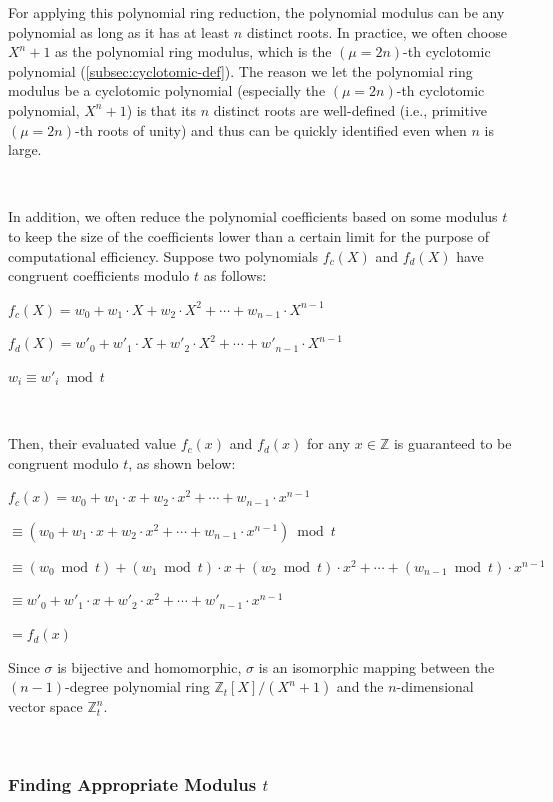 For applying this polynomial ring reduction, the polynomial modulus can be any polynomial as long as it has at least $n$ distinct roots. In practice, we often choose $X^n + 1$ as the polynomial ring modulus, which is the $(\mu=2n)$-th cyclotomic polynomial (\autoref{subsec:cyclotomic-def}). The reason we let the polynomial ring modulus be a cyclotomic polynomial (especially the $(\mu=2n)$-th cyclotomic polynomial, $X^n + 1$) is that its $n$ distinct roots are well-defined (i.e., primitive $(\mu=2n)$-th roots of unity) and thus can be quickly identified even when $n$ is large.

$ $

 In addition, we often reduce the polynomial coefficients based on some modulus $t$ to keep the size of the coefficients lower than a certain limit for the purpose of computational efficiency. Suppose two polynomials $f_c(X)$ and $f_d(X)$ have congruent coefficients modulo $t$ as follows:

$f_c(X) = w_0 + w_1\cdot X + w_2\cdot X^2 + \cdots + w_{n-1}\cdot X^{n-1}$

$f_d(X) = w'_0 + w'_1\cdot X + w'_2\cdot X^2 + \cdots + w'_{n-1}\cdot X^{n-1} $

$w_i \equiv w'_i \bmod t$

$ $

Then, their evaluated value $f_c(x)$ and $f_d(x)$ for any $x \in \mathbb{Z}$ is guaranteed to be congruent modulo $t$, as shown below:

$f_c(x) = w_0 + w_1\cdot x + w_2\cdot x^2 + \cdots + w_{n-1}\cdot x^{n-1}$

$\equiv (w_0 + w_1\cdot x + w_2\cdot x^2 + \cdots + w_{n-1}\cdot x^{n-1}) \bmod t $

$\equiv (w_0  \bmod t) + (w_1  \bmod t)\cdot x + (w_2  \bmod t)\cdot x^2 + \cdots + (w_{n-1} \bmod t)\cdot x^{n-1} $

$\equiv w'_0 + w'_1\cdot x + w'_2\cdot x^2 + \cdots + w'_{n-1}\cdot x^{n-1} $

$= f_d(x)$

 Since $\sigma$ is bijective and homomorphic, $\sigma$ is an isomorphic mapping between the $(n-1)$-degree polynomial ring $\mathbb{Z}_t[X]/(X^n + 1)$ and the $n$-dimensional vector space $\mathbb{Z}_t^n$. 


$ $


\subsubsection{Finding Appropriate Modulus $t$} 
\label{subsubsec:poly-vector-transformation-modulus}

